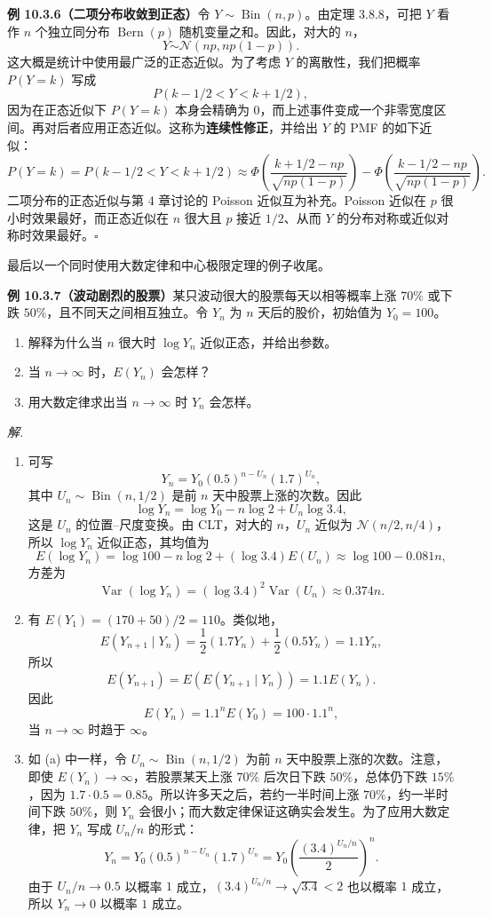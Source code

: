 \documentclass[UTF8, 12pt, fontset=fandol, oneside]{ctexart}
\begin{document}
\noindent\textbf{例 10.3.6（二项分布收敛到正态）}\quad 令 $Y\sim\operatorname{Bin}(n,p)$。由定理 3.8.8，可把 $Y$ 看作 $n$ 个独立同分布 $\operatorname{Bern}(p)$ 随机变量之和。因此，对大的 $n$，
\[
  Y\dot\sim\mathcal N(np,np(1-p)).
\]
这大概是统计中使用最广泛的正态近似。为了考虑 $Y$ 的离散性，我们把概率 $P(Y=k)$ 写成
\[
  P(k-1/2<Y<k+1/2),
\]
因为在正态近似下 $P(Y=k)$ 本身会精确为 $0$，而上述事件变成一个非零宽度区间。再对后者应用正态近似。这称为\textbf{连续性修正}，并给出 $Y$ 的 PMF 的如下近似：
\[
  P(Y=k)=P(k-1/2<Y<k+1/2)
  \approx
  \Phi\left(\frac{k+1/2-np}{\sqrt{np(1-p)}}\right)
  -\Phi\left(\frac{k-1/2-np}{\sqrt{np(1-p)}}\right).
\]
二项分布的正态近似与第 4 章讨论的 Poisson 近似互为补充。Poisson 近似在 $p$ 很小时效果最好，而正态近似在 $n$ 很大且 $p$ 接近 $1/2$、从而 $Y$ 的分布对称或近似对称时效果最好。$\square$

最后以一个同时使用大数定律和中心极限定理的例子收尾。

\noindent\textbf{例 10.3.7（波动剧烈的股票）}\quad 某只波动很大的股票每天以相等概率上涨 $70\%$ 或下跌 $50\%$，且不同天之间相互独立。令 $Y_n$ 为 $n$ 天后的股价，初始值为 $Y_0=100$。

\begin{enumerate}
  \item 解释为什么当 $n$ 很大时 $\log Y_n$ 近似正态，并给出参数。
  \item 当 $n\to\infty$ 时，$E(Y_n)$ 会怎样？
  \item 用大数定律求出当 $n\to\infty$ 时 $Y_n$ 会怎样。
\end{enumerate}

\noindent\textit{解.}\quad
\begin{enumerate}
  \item 可写
  \[
    Y_n=Y_0(0.5)^{n-U_n}(1.7)^{U_n},
  \]
  其中 $U_n\sim\operatorname{Bin}(n,1/2)$ 是前 $n$ 天中股票上涨的次数。因此
  \[
    \log Y_n=\log Y_0-n\log 2+U_n\log 3.4,
  \]
  这是 $U_n$ 的位置--尺度变换。由 CLT，对大的 $n$，$U_n$ 近似为 $\mathcal N(n/2,n/4)$，所以 $\log Y_n$ 近似正态，其均值为
  \[
    E(\log Y_n)=\log 100-n\log 2+(\log 3.4)E(U_n)
    \approx \log 100-0.081n,
  \]
  方差为
  \[
    \operatorname{Var}(\log Y_n)=(\log 3.4)^2\operatorname{Var}(U_n)
    \approx 0.374n.
  \]

  \item 有 $E(Y_1)=(170+50)/2=110$。类似地，
  \[
    E(Y_{n+1}\mid Y_n)=\frac12(1.7Y_n)+\frac12(0.5Y_n)=1.1Y_n,
  \]
  所以
  \[
    E(Y_{n+1})=E(E(Y_{n+1}\mid Y_n))=1.1E(Y_n).
  \]
  因此
  \[
    E(Y_n)=1.1^nE(Y_0)=100\cdot 1.1^n,
  \]
  当 $n\to\infty$ 时趋于 $\infty$。

  \item 如 (a) 中一样，令 $U_n\sim\operatorname{Bin}(n,1/2)$ 为前 $n$ 天中股票上涨的次数。注意，即使 $E(Y_n)\to\infty$，若股票某天上涨 $70\%$ 后次日下跌 $50\%$，总体仍下跌 $15\%$，因为 $1.7\cdot 0.5=0.85$。所以许多天之后，若约一半时间上涨 $70\%$，约一半时间下跌 $50\%$，则 $Y_n$ 会很小；而大数定律保证这确实会发生。为了应用大数定律，把 $Y_n$ 写成 $U_n/n$ 的形式：
  \[
    Y_n=Y_0(0.5)^{n-U_n}(1.7)^{U_n}
    =Y_0\left(\frac{(3.4)^{U_n/n}}{2}\right)^n.
  \]
  由于 $U_n/n\to 0.5$ 以概率 $1$ 成立，$(3.4)^{U_n/n}\to\sqrt{3.4}<2$ 也以概率 $1$ 成立，所以 $Y_n\to 0$ 以概率 $1$ 成立。
\end{enumerate}
\end{document}
